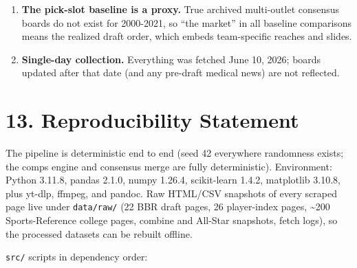 \documentclass[
  10pt,
]{article}
\begin{document}
\begin{enumerate}
  have only 4-6 accumulated seasons, making the Starter tier nearly unreachable
  for 2021 draftees and slightly depressing measured model skill in those folds
  (and the training signal for recent profiles).
\item
  \textbf{The pick-slot baseline is a proxy.} True archived multi-outlet
  consensus boards do not exist for 2000-2021, so ``the market'' in all baseline
  comparisons means the realized draft order, which embeds team-specific reaches
  and slides.
\item
  \textbf{Single-day collection.} Everything was fetched June 10, 2026; boards
  updated after that date (and any pre-draft medical news) are not reflected.
\end{enumerate}

\section{13. Reproducibility Statement}\label{reproducibility-statement}

The pipeline is deterministic end to end (seed 42 everywhere randomness exists;
the comps engine and consensus merge are fully deterministic). Environment:
Python 3.11.8, pandas 2.1.0, numpy 1.26.4, scikit-learn 1.4.2, matplotlib
3.10.8, plus yt-dlp, ffmpeg, and pandoc. Raw HTML/CSV snapshots of every scraped
page live under \texttt{data/raw/} (22 BBR draft pages, 26 player-index pages,
\textasciitilde200 Sports-Reference college pages, combine and All-Star
snapshots, fetch logs), so the processed datasets can be rebuilt offline.

\texttt{src/} scripts in dependency order:
\end{document}
